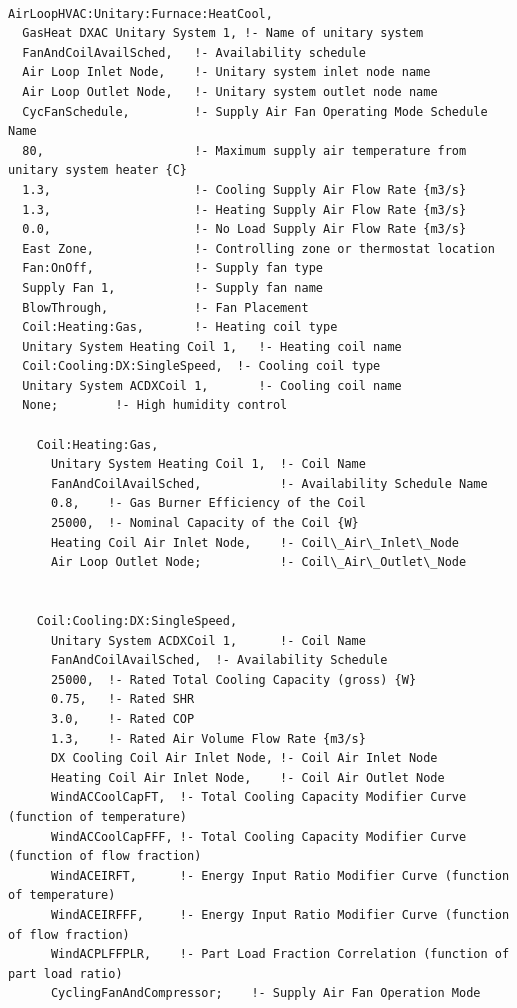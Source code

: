\begin{lstlisting}

AirLoopHVAC:Unitary:Furnace:HeatCool,
  GasHeat DXAC Unitary System 1, !- Name of unitary system
  FanAndCoilAvailSched,   !- Availability schedule
  Air Loop Inlet Node,    !- Unitary system inlet node name
  Air Loop Outlet Node,   !- Unitary system outlet node name
  CycFanSchedule,         !- Supply Air Fan Operating Mode Schedule Name
  80,                     !- Maximum supply air temperature from unitary system heater {C}
  1.3,                    !- Cooling Supply Air Flow Rate {m3/s}
  1.3,                    !- Heating Supply Air Flow Rate {m3/s}
  0.0,                    !- No Load Supply Air Flow Rate {m3/s}
  East Zone,              !- Controlling zone or thermostat location
  Fan:OnOff,              !- Supply fan type
  Supply Fan 1,           !- Supply fan name
  BlowThrough,            !- Fan Placement
  Coil:Heating:Gas,       !- Heating coil type
  Unitary System Heating Coil 1,   !- Heating coil name
  Coil:Cooling:DX:SingleSpeed,  !- Cooling coil type
  Unitary System ACDXCoil 1,       !- Cooling coil name
  None;        !- High humidity control

    Coil:Heating:Gas,
      Unitary System Heating Coil 1,  !- Coil Name
      FanAndCoilAvailSched,           !- Availability Schedule Name
      0.8,    !- Gas Burner Efficiency of the Coil
      25000,  !- Nominal Capacity of the Coil {W}
      Heating Coil Air Inlet Node,    !- Coil\_Air\_Inlet\_Node
      Air Loop Outlet Node;           !- Coil\_Air\_Outlet\_Node


    Coil:Cooling:DX:SingleSpeed,
      Unitary System ACDXCoil 1,      !- Coil Name
      FanAndCoilAvailSched,  !- Availability Schedule
      25000,  !- Rated Total Cooling Capacity (gross) {W}
      0.75,   !- Rated SHR
      3.0,    !- Rated COP
      1.3,    !- Rated Air Volume Flow Rate {m3/s}
      DX Cooling Coil Air Inlet Node, !- Coil Air Inlet Node
      Heating Coil Air Inlet Node,    !- Coil Air Outlet Node
      WindACCoolCapFT,  !- Total Cooling Capacity Modifier Curve (function of temperature)
      WindACCoolCapFFF, !- Total Cooling Capacity Modifier Curve (function of flow fraction)
      WindACEIRFT,      !- Energy Input Ratio Modifier Curve (function of temperature)
      WindACEIRFFF,     !- Energy Input Ratio Modifier Curve (function of flow fraction)
      WindACPLFFPLR,    !- Part Load Fraction Correlation (function of part load ratio)
      CyclingFanAndCompressor;    !- Supply Air Fan Operation Mode



\end{lstlisting}
